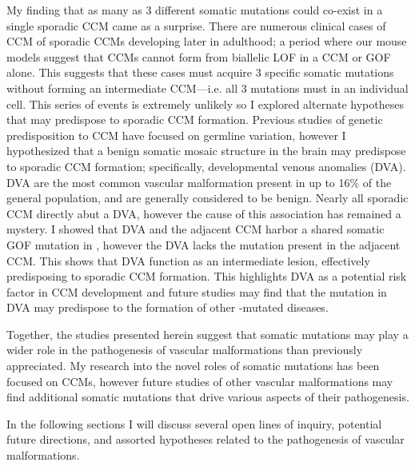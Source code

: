 My finding that as many as 3 different somatic mutations could co-exist in a single sporadic CCM came as a surprise. There are numerous clinical cases of CCM of sporadic CCMs developing later in adulthood; a period where our mouse models suggest that CCMs cannot form from biallelic LOF in a CCM or  GOF alone. This suggests that these cases must acquire 3 specific somatic mutations without forming an intermediate CCM---i.e. all 3 mutations must  in an individual cell. This series of events is extremely unlikely so I explored alternate hypotheses that may predispose to sporadic CCM formation. Previous studies of genetic predisposition to CCM have focused on germline variation, however I hypothesized that a benign somatic mosaic structure in the brain may predispose to sporadic CCM formation; specifically, developmental venous anomalies (DVA). DVA are the most common vascular malformation present in up to 16\% of the general population, and are generally considered to be benign. Nearly all sporadic CCM directly abut a DVA, however the cause of this association has remained a mystery. I showed that DVA and the adjacent CCM harbor a shared somatic GOF mutation in , however the DVA lacks the  mutation present in the adjacent CCM. This shows that DVA function as an intermediate lesion, effectively predisposing to sporadic CCM formation. This highlights DVA as a potential risk factor in CCM development and future studies may find that the  mutation in DVA may predispose to the formation of other -mutated diseases.

Together, the studies presented herein suggest that somatic mutations may play a wider role in the pathogenesis of vascular malformations than previously appreciated. My research into the novel roles of somatic mutations has been focused on CCMs, however future studies of other vascular malformations may find additional somatic mutations that drive various aspects of their pathogenesis. 

In the following sections I will discuss several open lines of inquiry, potential future directions, and assorted hypotheses related to the pathogenesis of vascular malformations. 




